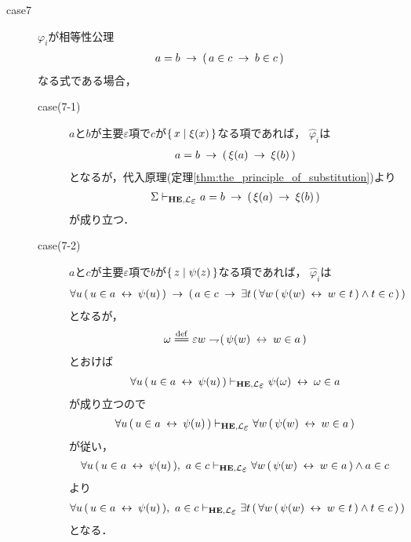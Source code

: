 \begin{metaprf}
\begin{description}
			\item[case7] $\varphi_{i}$が相等性公理
				\begin{align}
					a = b \hspace{0.25em}\rightarrow\hspace{0.25em} (\, a \in c \hspace{0.25em}\rightarrow\hspace{0.25em} b \in c\, )
				\end{align}
				なる式である場合，
				\begin{description}
					\item[case(7-1)] $a$と$b$が主要$\varepsilon$項で$c$が$\{\, x \mid \xi(x)\, \}$なる項であれば，
						$\widehat{\varphi}_{i}$は
						\begin{align}
							a = b \hspace{0.25em}\rightarrow\hspace{0.25em} (\, \xi(a) \hspace{0.25em}\rightarrow\hspace{0.25em} \xi(b)\, )
						\end{align}
						となるが，代入原理(定理\ref{thm:the_principle_of_substitution})より
						\begin{align}
							\Sigma \provable{\mbox{{\bf HE}},\lang{\varepsilon}} a = b \rarrow (\, \xi(a) \rarrow \xi(b)\, )
						\end{align}
						が成り立つ．
						
					\item[case(7-2)] $a$と$c$が主要$\varepsilon$項で$b$が$\{\, z \mid \psi(z)\, \}$なる項であれば，
						$\widehat{\varphi}_{i}$は
						\begin{align}
							\forall u\, (\, u \in a \hspace{0.25em}\leftrightarrow\hspace{0.25em} \psi(u)\, ) 
							\hspace{0.25em}\rightarrow\hspace{0.25em} (\, a \in c 
							\hspace{0.25em}\rightarrow\hspace{0.25em} \exists t\, (\, \forall w\, (\, \psi(w) \hspace{0.25em}\leftrightarrow\hspace{0.25em} w \in t\, ) \wedge t \in c\, )\, )
						\end{align}
						となるが，
						\begin{align}
							\omega \defeq \varepsilon w \negation (\, \psi(w) \lrarrow w \in a\, )
						\end{align}
						とおけば
						\begin{align}
							\forall u\, (\, u \in a \lrarrow \psi(u)\, )
							\provable{\mbox{{\bf HE}},\lang{\varepsilon}} \psi(\omega) \lrarrow \omega \in a 
						\end{align}
						が成り立つので
						\begin{align}
							\forall u\, (\, u \in a \lrarrow \psi(u)\, )
							\provable{\mbox{{\bf HE}},\lang{\varepsilon}} \forall w\, (\, \psi(w) \lrarrow w \in a\, )
						\end{align}
						が従い，
						\begin{align}
							\forall u\, (\, u \in a \lrarrow \psi(u)\, ),\ a \in c
							\provable{\mbox{{\bf HE}},\lang{\varepsilon}} \forall w\, (\, \psi(w) \lrarrow w \in a\, ) \wedge a \in c
						\end{align}
						より
						\begin{align}
							\forall u\, (\, u \in a \lrarrow \psi(u)\, ),\ a \in c
							\provable{\mbox{{\bf HE}},\lang{\varepsilon}} \exists t\, (\, \forall w\, (\, \psi(w) \lrarrow w \in t\, ) \wedge t \in c\, )\, )
						\end{align}
						となる．
						

\end{description}
\end{description}
\end{metaprf}
